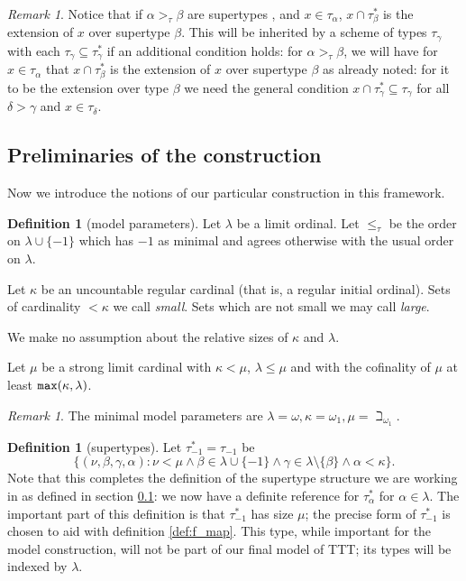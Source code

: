 \documentclass[112pt]{article}
\theoremstyle{definition}
\newtheorem{definition}[theorem]{Definition}
\theoremstyle{remark}
\newtheorem{remark}[theorem]{Remark}
\newcommand{\rk}[1]{{\color{blue}\sl #1}}
\begin{document}
\begin{remark}
Notice that if $\alpha>_\tau \beta$ are supertypes %
, and $x \in \tau_\alpha$, $x \cap \tau^*_\beta$ is the extension of $x$ over supertype $\beta$.  This will be inherited by a scheme of types $\tau_\gamma$ with each $\tau_\gamma \subseteq \tau^*_\gamma$ if an additional condition holds:  for $\alpha>_\tau\beta$, we will have
for $x \in \tau_\alpha$ that $x \cap \tau^*_\beta$ is the extension of $x$ over supertype $\beta$ as already noted:  for it to be the extension over type $\beta$ we need the general condition $x \cap \tau^*_\gamma \subseteq \tau_\gamma$ for all $\delta>\gamma$ and $x \in \tau_\delta$.
\end{remark}

\subsection{Preliminaries of the construction}
\label{ss:preliminaries}

Now we introduce the notions of our particular construction in this framework.
\begin{definition}[model parameters]\label{def:model_params}
Let $\lambda$ be a limit ordinal.  Let $\leq_\tau$ be the order on $\lambda \cup \{-1\}$ which has $-1$ as minimal and agrees otherwise with the usual order on $\lambda$.

Let $\kappa$ be an uncountable regular cardinal (that is, a regular initial ordinal).  Sets of cardinality $<\kappa$ we call {\em small\/}.  Sets which are not small we may call {\em large\/}.

We make no assumption about the relative sizes of $\kappa$ and $\lambda$.

Let $\mu$ be a strong limit cardinal with $\kappa<\mu$, $\lambda \leq \mu$ and with the cofinality of $\mu$ at least ${\tt max}(\kappa,\lambda)$.
\end{definition}
\begin{remark}\label{rk:example_model_params}
{The minimal model parameters are $\lambda = \omega, \kappa = \omega_1, \mu = \beth_{\omega_1}$.}
\end{remark}

\begin{definition}[supertypes]\label{def:supertypes}
Let $\tau^*_{-1}=\tau_{-1}$ be $$\{(\nu,\beta,\gamma,\alpha):\nu<\mu \wedge  \beta \in \lambda\cup \{-1\} \wedge \gamma \in \lambda \setminus \{\beta\}\wedge \alpha<\kappa\}.$$  Note that this completes the definition of the supertype structure we are working in as defined in section \ref{ss:preliminaries}:  we now have a definite reference
for $\tau^*_\alpha$ for $\alpha\in \lambda$.
The important part of this definition is that $\tau_{-1}^*$ has size $\mu$; the precise form of $\tau_{-1}^*$ is chosen to aid with definition \ref{def:f_map}. This type, while important for the model construction, will not be part of our final model of TTT; its types will be indexed by $\lambda$.
\end{definition}
\end{document}
